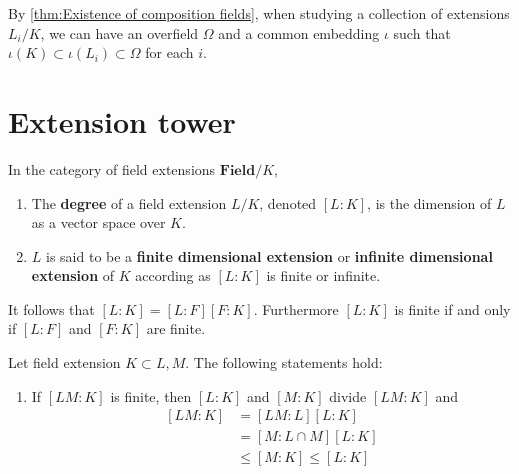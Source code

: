 By \cref{thm:Existence of composition fields}, when studying a collection of extensions $L_i/K$, we can have an overfield $\Omega$ and a common embedding $\iota$ such that $\iota(K) \subset \iota(L_i) \subset \Omega$ for each $i$.




\section{Extension tower}
\begin{definition}
    In the category of field extensions $\mathbf{Field}/K$,
    \begin{enumerate}
        \item
              The \textbf{degree} of a field extension $L / K$, denoted $[L:K]$, is the dimension of $L$ as a vector space over $K$.

        \item
              $L$ is said to be a \textbf{finite dimensional extension} or \textbf{infinite dimensional extension} of $K$ according as $[L: K]$ is finite or infinite.
    \end{enumerate}
    It follows that $[L:K ]=[L:F][F:K]$.
    Furthermore $[L: K]$ is finite if and only if $[L: F]$ and $[F: K]$ are finite.
\end{definition}
\begin{theorem}
    Let field extension $K\subset L, M$.
    The following statements hold:
    \begin{enumerate}


        \item
              If $[L M: K]$ is finite, then $[L: K]$ and $[M: K]$ divide $[L M: K]$ and
              \begin{equation*}
                  \begin{aligned}
                      [L M: K]
                       & = \left[LM:L\right]
                      \left[L:K\right]        \\
                       & =
                      \left[M:L\cap M\right]
                      \left[L:K\right]        \\
                       & \leq[M: K]\leq[L: K]
                  \end{aligned}
              \end{equation*}
    \end{enumerate}
\end{theorem}

